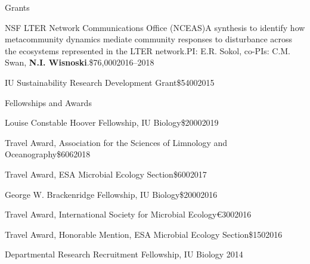 \documentclass{resume} %
\begin{document}
\begin{rSection}{Grants}

\begin{Grant}{NSF LTER Network Communications Office (NCEAS)}{A synthesis to identify how metacommunity dynamics mediate community responses to disturbance across the ecosystems represented in the LTER network.}{PI: E.R. Sokol, co-PIs: C.M. Swan, {\bf N.I. Wisnoski}.}{\$76,000}{2016--2018}
\end{Grant}


\begin{Grant}{IU Sustainability Research Development Grant}{}{}{\$5400}{2015}
\end{Grant}

\end{rSection}

\bigskip


\begin{rSection}{Fellowships and Awards}

\begin{Award}{Louise Constable Hoover Fellowship, IU Biology}{\$2000}{2019}
\end{Award}

\begin{Award}{Travel Award, Association for the Sciences of Limnology and Oceanography}{\$606}{2018}
\end{Award}

\begin{Award}{Travel Award, ESA Microbial Ecology Section}{\$600}{2017}
\end{Award}

\begin{Award}{George W. Brackenridge Fellowship, IU Biology}{\$2000}{2016}
\end{Award}

\begin{Award}{Travel Award, International Society for Microbial Ecology}{\euro{}300}{2016}
\end{Award}

\begin{Award}{Travel Award, Honorable Mention, ESA Microbial Ecology Section}{\$150}{2016}
\end{Award}

\begin{Award}{Departmental Research Recruitment Fellowship, IU Biology}{ }{2014}
\end{Award}

\end{rSection}
\end{document}
